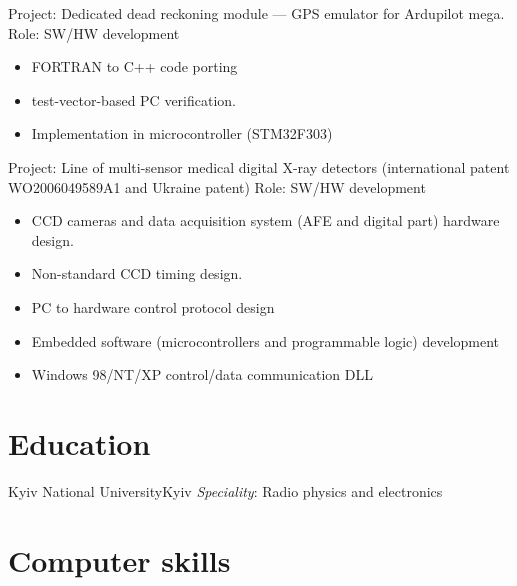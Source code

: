 \documentclass[11pt,a4paper]{moderncv}
\begin{document}
  {Project: Dedicated dead reckoning module — GPS emulator for Ardupilot mega.\newline{}
    Role: SW/HW development
    \begin{itemize}
      \item FORTRAN to C++ code porting
      \item test-vector-based PC verification.
      \item Implementation in microcontroller (STM32F303)
    \end{itemize}}
  {Project: Line of multi-sensor medical digital X-ray detectors (international patent
WO2006049589A1 and Ukraine patent)\newline{}
    Role: SW/HW development
    \begin{itemize}
      \item CCD cameras and data acquisition system (AFE and digital part) hardware design.
      \item Non-standard CCD timing design.
      \item PC to hardware control protocol design
      \item Embedded software (microcontrollers and programmable logic) development
      \item Windows 98/NT/XP control/data communication DLL
    \end{itemize}}


\section{Education}
  {Kyiv National University}{Kyiv}{}
  {\textit{Speciality}: Radio physics and electronics}

\section{Computer skills}
\end{document}
